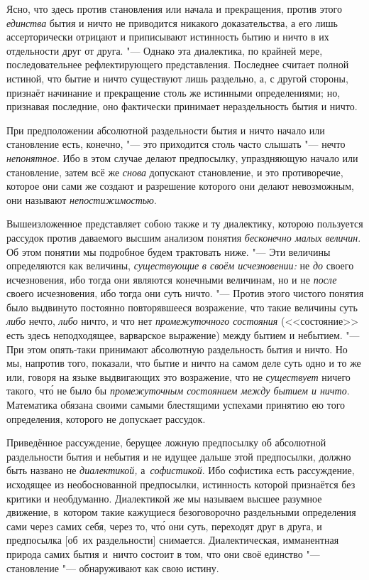 Ясно, что здесь против становления или начала и прекращения, против этого {\em
единства} бытия и ничто не приводится никакого доказательства, а его лишь
ассерторически отрицают и приписывают истинность бытию и ничто в их отдельности
друг от друга. "--- Однако эта диалектика, по крайней мере, последовательнее
рефлектирующего представления. Последнее считает полной истиной, что бытие и
ничто существуют лишь раздельно, а, с другой стороны, признаёт начинание и
прекращение столь же истинными определениями; но, признавая последние, оно
фактически принимает нераздельность бытия и ничто.

При предположении абсолютной раздельности бытия и ничто начало или становление
есть, конечно, "--- это приходится столь часто слышать "--- нечто
{\em непонятное}. Ибо в этом случае делают предпосылку, упраздняющую начало
или становление, затем всё же {\em снова} допускают становление, и это
противоречие, которое они сами же создают и разрешение которого они делают
невозможным, они называют {\em непостижимостью}.

Вышеизложенное представляет собою также и ту диалектику, которою пользуется
рассудок против даваемого высшим анализом понятия {\em бесконечно малых
величин}. Об этом понятии мы подробное будем трактовать ниже. "--- Эти величины
определяются как величины, {\em существующие} {\em в своём исчезновении:} не {\em до}
своего исчезновения, ибо тогда они являются конечными величинам, но и не
{\em после} своего исчезновения, ибо тогда они суть ничто. "--- Против этого
чистого понятия было выдвинуто постоянно повторявшееся возражение, что такие
величины суть {\em либо} нечто, {\em либо} ничто, и что нет {\em промежуточного
состояния} (<<состояние>> есть здесь неподходящее, варварское выражение) между
бытием и небытием. "--- При этом опять-таки принимают абсолютную раздельность
бытия и ничто. Но мы, напротив того, показали, что бытие и ничто на самом деле
суть одно и то же или, говоря на языке выдвигающих это возражение, что не
{\em существует} ничего такого, чт\'{о} не было бы {\em промежуточным
состоянием между бытием и ничто}. Математика обязана своими самыми блестящими
успехами принятию ею того определения, которого не допускает рассудок.

Приведённое рассуждение, берущее ложную предпосылку об абсолютной раздельности
бытия и небытия и не идущее дальше этой предпосылки, должно быть названо не
{\em диалектикой,} а~{\em софистикой}. Ибо софистика есть рассуждение,
исходящее из необоснованной предпосылки, истинность которой признаётся без
критики и необдуманно. Диалектикой же мы называем высшее разумное движение,
в~котором такие кажущиеся безоговорочно раздельными определения сами через
самих себя, через то, чт\'{о} они суть, переходят друг в друга, и предпосылка
[об~их раздельности] снимается. Диалектическая, имманентная природа самих бытия
и~ничто состоит в том, что они своё единство "--- становление "--- обнаруживают
как свою истину.

